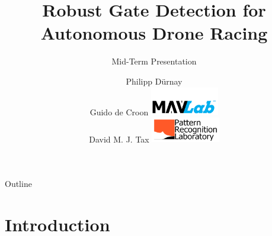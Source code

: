 \documentclass{beamer}
\title{Robust Gate Detection for Autonomous Drone Racing} %
\subtitle{Mid-Term Presentation} %
\author{Philipp Dürnay\\ \bigskip \bigskip Guido de Croon \hfill	\includegraphics[width=3cm]{fig/mavlab}\\
	 David M. J. Tax  \hfill \includegraphics[width=3cm]{fig/prgroup}%
}
\begin{document}
  \frame{\maketitle}


  \begin{darkframes}
  	\begin{frame}{Outline}
  		\tableofcontents
  	\end{frame}
	\section{Introduction}

\end{darkframes}
\end{document}
